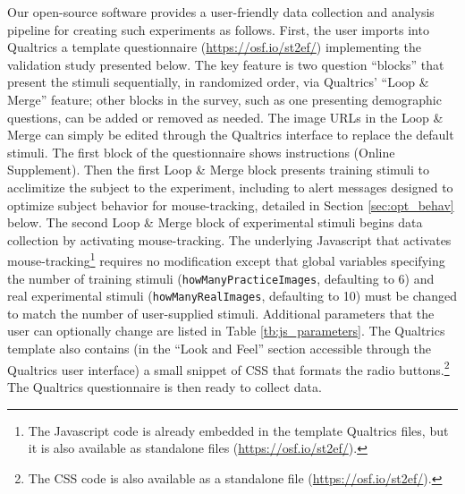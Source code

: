 \documentclass[]{article}
\let\rmarkdownfootnote\footnote%
\def\footnote{\protect\rmarkdownfootnote}
\begin{document}
Our open-source software provides a user-friendly data collection and
analysis pipeline for creating such experiments as follows. First, the
user imports into Qualtrics a template questionnaire
(\url{https://osf.io/st2ef/}) implementing the validation study
presented below. The key feature is two question ``blocks'' that present
the stimuli sequentially, in randomized order, via Qualtrics' ``Loop \&
Merge'' feature; other blocks in the survey, such as one presenting
demographic questions, can be added or removed as needed. The image URLs
in the Loop \& Merge can simply be edited through the Qualtrics
interface to replace the default stimuli. The first block of the
questionnaire shows instructions (Online Supplement). Then the first
Loop \& Merge block presents training stimuli to acclimitize the subject
to the experiment, including to alert messages designed to optimize
subject behavior for mouse-tracking, detailed in Section
\ref{sec:opt_behav} below. The second Loop \& Merge block of
experimental stimuli begins data collection by activating
mouse-tracking. The underlying Javascript that activates
mouse-tracking\footnote{The Javascript code is already embedded in the template Qualtrics files, but it is also available as standalone files (\url{https://osf.io/st2ef/}).}
requires no modification except that global variables specifying the
number of training stimuli (\texttt{howManyPracticeImages}, defaulting
to 6) and real experimental stimuli (\texttt{howManyRealImages},
defaulting to 10) must be changed to match the number of user-supplied
stimuli. Additional parameters that the user can optionally change are
listed in Table \ref{tb:js_parameters}. The Qualtrics template also
contains (in the ``Look and Feel'' section accessible through the
Qualtrics user interface) a small snippet of CSS that formats the radio
buttons.\footnote{The CSS code is also available as a standalone file (\url{https://osf.io/st2ef/}).}
The Qualtrics questionnaire is then ready to collect data.
\end{document}

